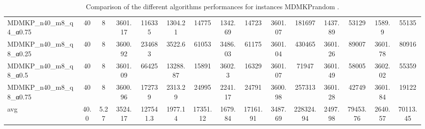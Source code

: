\begin{table}[!ht]
{\begin{tabular}{lcccccccccccccc}
MDMKP\_n40\_m8\_q4\_α0.75 & 40 & 8 & 3601.17 & 116335 & 1304.21 & 14775 & 1342.69 & 14723 & 3601.07 & 181697 & 1437.89 & 53129 & 1589.9 & 55135 \\
MDMKP\_n40\_m8\_q8\_α0.25 & 40 & 8 & 3600.92 & 234683 & 3522.6 & 61053 & 3486.03 & 61175 & 3601.04 & 430465 & 3601.26 & 89007 & 3601.78 & 80916 \\
MDMKP\_n40\_m8\_q8\_α0.5 & 40 & 8 & 3601.09 & 66425 & 13288.87 & 15891 & 3602.3 & 16329 & 3601.07 & 71947 & 3601.49 & 58005 & 3602.02 & 55359 \\
MDMKP\_n40\_m8\_q8\_α0.75 & 40 & 8 & 3600.96 & 172739 & 2313.29 & 24995 & 2241.17 & 24791 & 3600.98 & 257313 & 3601.28 & 42749 & 3601.84 & 19122 \\
\hline avg & 40.0 & 5.27 &  3524.17 & 127541.3 &  1977.14 & 17351.12 &  1679.84 & 17161.91 &  3487.69 & 228324.94 &  2497.98 & 79453.76 &  2640.57 & 70113.45 \\ \hline
\bottomrule
\end{tabular}
}%
\caption{Comparison of the different algorithms performances for instances MDMKPrandom .}
\end{table}
